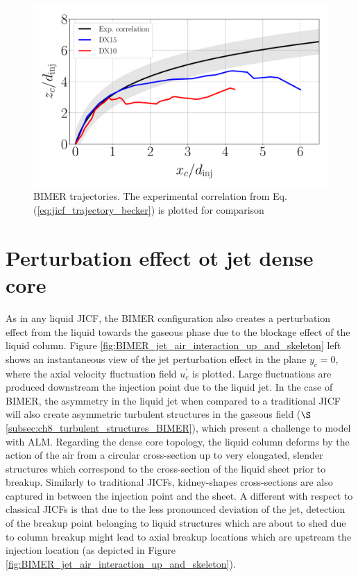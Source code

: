 \begin{figure}[ht]
\centering
   \includegraphics[scale=0.3]{./part3_applications/figures_ch8_resolved/trajectories_BIMER}
   \caption[BIMER trajectories]{BIMER trajectories. The experimental correlation from Eq. (\ref{eq:jicf_trajectory_becker})  is plotted for comparison}
\label{fig:BIMER_trajectories}
\end{figure}


\section{Perturbation effect ot jet dense core}
\label{ch8:sec_BIMER_DC_characterization}

As in any liquid JICF, the BIMER configuration also creates a perturbation effect from the liquid towards the gaseous phase due to the blockage effect of the liquid column. Figure \ref{fig:BIMER_jet_air_interaction_up_and_skeleton} left shows an instantaneous view of the jet perturbation effect in the plane $y_c = 0$, where the axial velocity fluctuation field $u^\prime_c$ is plotted. Large fluctuations are produced downstream the injection point due to the liquid jet. In the case of BIMER, the asymmetry in the liquid jet when compared to a traditional JICF will also create asymmetric turbulent structures in the gaseous field ($\S$\ref{subsec:ch8_turbulent_structures_BIMER}), which present a challenge to model with ALM. Regarding the dense core topology, the liquid column deforms by the action of the air from a circular cross-section up to very elongated, slender structures which correspond to the cross-section of the liquid sheet prior to breakup. Similarly to traditional JICFs, kidney-shapes cross-sections are also captured in between the injection point and the sheet. A different with respect to classical JICFs is that due to the less pronounced deviation of the jet, detection of the breakup point belonging to liquid structures which are about to shed due to column breakup might lead to axial breakup locations which are upstream the injection location (as depicted in Figure \ref{fig:BIMER_jet_air_interaction_up_and_skeleton}).



